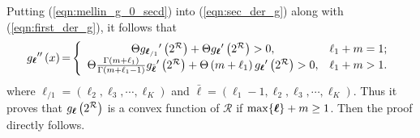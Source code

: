 \documentclass[12pt,onecolumn,draftcls]{IEEEtran}
\newcommand{\bs}{\boldsymbol}
\begin{document}
Putting (\ref{eqn:mellin_g_0_secd}) into (\ref{eqn:sec_der_g}) along with (\ref{eqn:first_der_g}), it follows that
\begin{equation}\label{eqn:sec_der_g_fin}
{g_{\bs{\ell}}}^{\prime \prime }\left( x \right){\rm{ = }}\left\{ {\begin{array}{*{20}{c}}
{\Theta {g_{{{\bs{\ell}}_{/1}}}}^\prime \left( {{2^{\cal R}}} \right) + \Theta {g_{\bs{\ell}}}^\prime \left( {{2^{\cal R}}} \right)>0,}&{{\ell_1} + m = 1{\rm{;}}}\\
{\Theta \frac{{\Gamma \left( {m + {\ell_1}} \right)}}{{\Gamma \left( {m + {\ell_1} - 1} \right)}}{g_{\bar {{\bs{\ell}}}}}^\prime \left( {{2^{\cal R}}} \right) + \Theta \left( {m + {\ell_1}} \right){g_{\bs{\ell}}}^\prime \left( {{2^{\cal R}}} \right)>0,}&{{\ell_1} + m > 1.}
\end{array}} \right.
\end{equation}
where ${{\bs{\ell}}_{/1}} = \left( {{\ell_2},{\ell_3}, \cdots ,{\ell_K}} \right)$ and $\bar {{\bs{\ell}}} = \left( {{\ell_1} - 1,{\ell_2},{\ell_3}, \cdots ,{\ell_K}} \right)$. Thus it proves that ${{g_{\bs{\ell}}}\left(  2^{\cal R} \right)}$ is a convex function of $\mathcal R$ if ${\rm max}{\{\bs{\ell}\}}+m \ge 1$.  Then the proof directly follows.%
\end{document}
